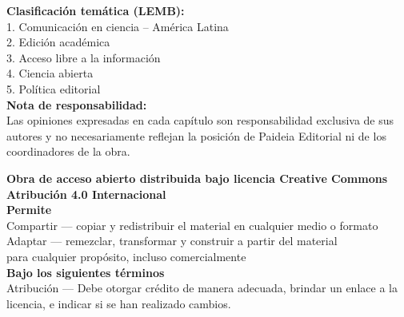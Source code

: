 \noindent\textbf{Clasificación temática (LEMB):}\\
1. Comunicación en ciencia -- América Latina\\
2. Edición académica\\
3. Acceso libre a la información\\
4. Ciencia abierta\\
5. Política editorial\\[1em]

\noindent\textbf{Nota de responsabilidad:}\\
Las opiniones expresadas en cada capítulo son responsabilidad exclusiva de sus autores y no necesariamente reflejan la posición de Paideia Editorial ni de los coordinadores de la obra.\\[1em]

\vspace*{\fill}

\begin{center}
\small
\textbf{Obra de acceso abierto distribuida bajo licencia Creative Commons Atribución 4.0 Internacional}\\[0.5em]

\textbf{Permite}\\
Compartir — copiar y redistribuir el material en cualquier medio o formato\\
Adaptar — remezclar, transformar y construir a partir del material\\
para cualquier propósito, incluso comercialmente\\[0.5em]

\textbf{Bajo los siguientes términos}\\
Atribución — Debe otorgar crédito de manera adecuada, brindar un enlace a la licencia, e indicar si se han realizado cambios.
\end{center}

\newpage